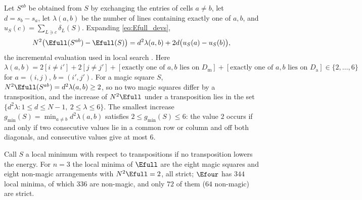 \begin{remark}
\label{rem:swap}
Let $S^{ab}$ be obtained from $S$ by exchanging the entries of cells $a\ne b$, let $d=s_b-s_a$, let $\lambda(a,b)$ be the number of lines containing exactly one of $a,b$, and $u_S(c)=\sum_{L\ni c}\delta_L(S)$.
Expanding \eqref{eq:Efull_devs},
\[
N^{2}\bigl(\Efull(S^{ab})-\Efull(S)\bigr)=d^{2}\lambda(a,b)+2d\bigl(u_S(a)-u_S(b)\bigr),
\]
the incremental evaluation used in local search \cite{pinn1998number}.
Here $\lambda(a,b)=2[i\ne i']+2[j\ne j']+[\text{exactly one of }a,b\text{ lies on }D_{\mathrm m}]+[\text{exactly one of }a,b\text{ lies on }D_{\mathrm a}]\in\{2,\dots,6\}$ for $a=(i,j)$, $b=(i',j')$.
For a magic square $S$, $N^2\Efull(S^{ab})=d^2\lambda(a,b)\ge2$, so no two magic squares differ by a transposition, and the increase of $N^2\Efull$ under a transposition lies in the set $\{d^2\lambda:1\le d\le N-1,\ 2\le\lambda\le6\}$.
The smallest increase $g_{\min}(S)=\min_{a\ne b}d^2\lambda(a,b)$ satisfies $2\le g_{\min}(S)\le6$: the value $2$ occurs if and only if two consecutive values lie in a common row or column and off both diagonals, and consecutive values give at most $6$.
\end{remark}

Call $S$ a local minimum with respect to transpositions if no transposition lowers the energy.
For $n=3$ the local minima of $\Efull$ are the eight magic squares and eight non-magic arrangements with $N^2\Efull=2$, all strict; $\Efour$ has $344$ local minima, of which $336$ are non-magic, and only $72$ of them ($64$ non-magic) are strict.

